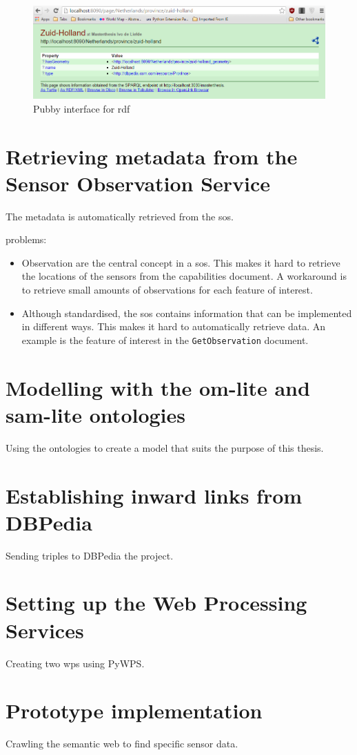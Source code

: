 \begin{figure}
	\includegraphics[width=\linewidth]{figs/pubby.PNG}
	\caption{Pubby interface for \ac{rdf}}
	\label{fig:Pubby}
\end{figure}


\section{Retrieving metadata from the Sensor Observation Service}
The metadata is automatically retrieved from the \ac{sos}.

problems: 
\begin{itemize}
	\item Observation are the central concept in a \ac{sos}. This makes it hard to retrieve the locations of the sensors from the capabilities document. A workaround is to retrieve small amounts of observations for each feature of interest.
	\item Although standardised, the \ac{sos} contains information that can be implemented in different ways. This makes it hard to automatically retrieve data. An example is the feature of interest in the \texttt{GetObservation} document. 
\end{itemize}

\section{Modelling with the om-lite and sam-lite ontologies}
Using the ontologies to create a model that suits the purpose of this thesis.

\section{Establishing inward links from DBPedia}
Sending triples to DBPedia the project.

\section{Setting up the Web Processing Services}
Creating two \ac{wps} using PyWPS.

\section{Prototype implementation}
Crawling the semantic web to find specific sensor data.